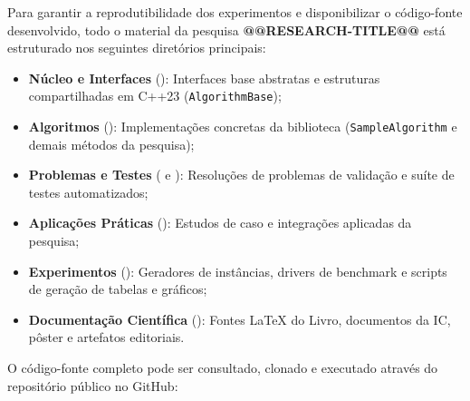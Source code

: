 \newpage

\label{ap:github}

Para garantir a reprodutibilidade dos experimentos e disponibilizar o código-fonte desenvolvido, todo o material da pesquisa \textbf{@@RESEARCH-TITLE@@} está estruturado nos seguintes diretórios principais:
\begin{itemize}[leftmargin=1.5em, itemsep=0.2em]
\raggedright
    \item \textbf{Núcleo e Interfaces} (): Interfaces base abstratas e estruturas compartilhadas em C++23 (\lstinline{AlgorithmBase});
    \item \textbf{Algoritmos} (): Implementações concretas da biblioteca (\lstinline{SampleAlgorithm} e demais métodos da pesquisa);
    \item \textbf{Problemas e Testes} ( e ): Resoluções de problemas de validação e suíte de testes automatizados;
    \item \textbf{Aplicações Práticas} (): Estudos de caso e integrações aplicadas da pesquisa;
    \item \textbf{Experimentos} (): Geradores de instâncias, drivers de benchmark e scripts de geração de tabelas e gráficos;
    \item \textbf{Documentação Científica} (): Fontes LaTeX do Livro, documentos da IC, pôster e artefatos editoriais.
\end{itemize}

O código-fonte completo pode ser consultado, clonado e executado através do repositório público no GitHub:

\vspace{0.4cm}
\begin{center}
\end{center}
\vspace{0.4cm}
